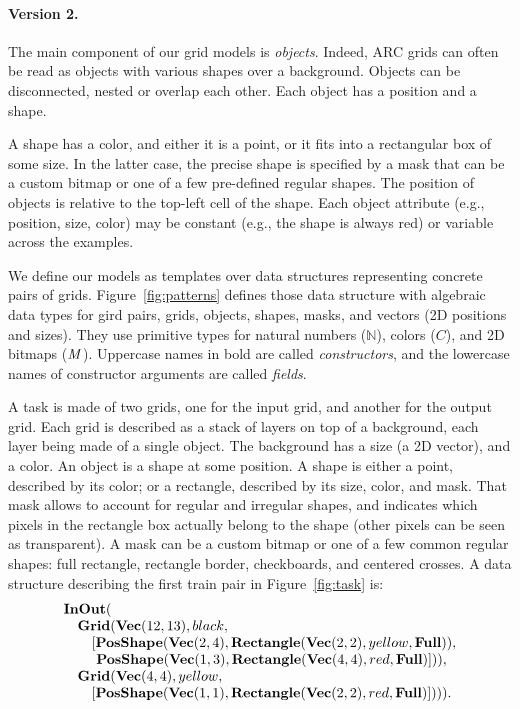 \documentclass[a4paper]{llncs}
\newcommand{\nat}{\mathbb{N}}
\begin{document}
\paragraph{Version 2.}
The main component of our grid models is {\em objects}. Indeed, ARC
grids can often be read as objects with various shapes over a
background. Objects can be disconnected, nested or overlap each
other. Each object has a position and a shape.

A shape has a color, and either it is a point, or it fits into a
rectangular box of some size. In the latter case, the precise shape is
specified by a mask that can be a custom bitmap or one of a few
pre-defined regular shapes. The position of objects is relative to the
top-left cell of the shape. Each object attribute (e.g., position,
size, color) may be constant (e.g., the shape is always red) or
variable across the examples.

We define our models as templates over data structures representing
concrete pairs of grids. Figure~\ref{fig:patterns} defines those data
structure with algebraic data types for gird pairs, grids, objects,
shapes, masks, and vectors (2D positions and sizes). They use
primitive types for natural numbers ($\nat$), colors ($C$), and 2D
bitmaps (${\it M}$). Uppercase names in bold are called {\em
  constructors}, and the lowercase names of constructor arguments are
called {\em fields}.

A task is made of two grids, one for the input grid, and another for
the output grid.
%
Each grid is described as a stack of layers on top of a background,
each layer being made of a single object. The background has a size (a
2D vector), and a color.
%
An object is a shape at some position. A shape is either a point,
described by its color; or a rectangle, described by its size, color,
and mask. That mask allows to account for regular and irregular
shapes, and indicates which pixels in the rectangle box actually
belong to the shape (other pixels can be seen as transparent).
%
A mask can be a custom bitmap or one of a few common regular shapes:
full rectangle, rectangle border, checkboards, and centered crosses.
%
A data structure describing the first train pair in Figure~\ref{fig:task}
is:
\[\begin{array}{l}
    {\bf InOut}( \\
    \quad {\bf Grid}({\bf Vec}(12,13), black,\\
    \quad \quad [{\bf PosShape}({\bf Vec}(2,4), {\bf Rectangle}({\bf Vec}(2,2), yellow, {\bf Full})),\\
    \quad \quad ~{\bf PosShape}({\bf Vec}(1,3), {\bf Rectangle}({\bf Vec}(4,4), red, {\bf Full})])), \\
    \quad {\bf Grid}({\bf Vec}(4,4), yellow, \\
    \quad \quad [{\bf PosShape}({\bf Vec}(1,1), {\bf Rectangle}({\bf Vec}(2,2), red, {\bf Full})]))).
  \end{array} \]
\end{document}
